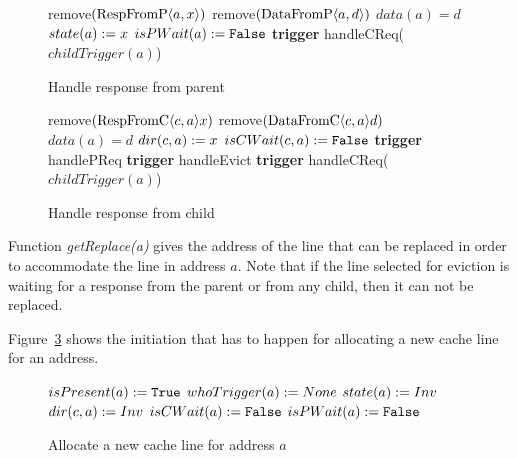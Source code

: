 \begin{figure}
\begin{algorithmic}
  \State remove$(\text{RespFromP$\langle a,x\rangle$})$
     \State remove$(\text{DataFromP$\langle a,d\rangle$})$
     \State $data(a) = d$
  \EndIf
  \State $state(a) := x$
  \State $isPWait(a) := \texttt{False}$ 
  \State \textcolor{trig-color}{\textbf{trigger} handleCReq($childTrigger(a)$)}
\EndRule
\end{algorithmic}
\caption{Handle response from parent}
\label{alg:handlePResp}
\end{figure}

\begin{figure}
\begin{algorithmic}
  \State remove$(\text{RespFromC$\langle c,a\rangle$}{x})$
     \State remove$(\text{DataFromC$\langle c,a\rangle$}{d})$
     \State $data(a) = d$
  \EndIf
  \State $dir(c,a) := x$
    \State $isCWait(c, a) := \texttt{False}$
  \EndIf
  {\color{trig-color}
     \State \textbf{trigger} handlePReq
     \State \textbf{trigger} handleEvict
     \State \textbf{trigger} handleCReq($childTrigger(a)$)
  \EndIf}
\EndRule
\end{algorithmic}
\caption{Handle response from child}
\label{alg:handleCResp}
\end{figure}

Function \emph{getReplace(a)} gives the address of the line that can be replaced
in order to accommodate the line in address $a$. Note that if the line selected
for eviction is waiting for a response from the parent or from any child, then
it can not be replaced.

Figure~\ref{alg:allocLine} shows the initiation that has to happen for
allocating a new cache line for an address.

\begin{figure}
\begin{algorithmic}
  \State $isPresent(a) := \texttt{True}$
  \State \textcolor{trig-color}{$whoTrigger(a) := None$}
  \State $state(a) := \text{$Inv$}$
     \State $dir(c, a) := \text{$Inv$}$
  \EndFor
  \State $isCWait(a) := \texttt{False}$
  \State $isPWait(a) := \texttt{False}$
\EndProcedure
\end{algorithmic}
\caption{Allocate a new cache line for address $a$}
\label{alg:allocLine}
\end{figure}

